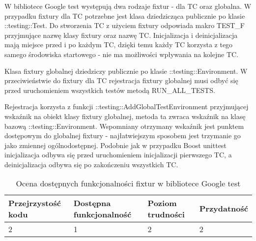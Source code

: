 \documentclass[12pt,a4paper,notitlepage]{report}
\begin{document}
W bibliotece Google test występują dwa rodzaje fixtur - dla TC oraz globalna.
W przypadku fixtury dla TC potrzebne jest klasa dziedzicząca publicznie po klasie ::testing::Test. Do stworzenia TC z użyciem fixtury odpowiada makro TEST{\_}F przyjmujące nazwę klasy fixtury oraz nazwę TC. Inicjalizacja i deinicjalizacja mają miejsce przed i po każdym TC, dzięki temu każdy TC korzysta z tego samego środowiska startowego - nie ma możliwości wpływania na kolejne TC.

			

Klasa fixtury globalnej dziedziczy publicznie po klasie ::testing::Environment. W przeciwieństwie do fixtury dla TC rejestracja fixtury globalnej musi odbyć się przed uruchomieniem wszystkich testów metodą RUN{\_}ALL{\_}TESTS.

Rejestracja korzysta z funkcji ::testing::AddGlobalTestEnvironment przyjmującej wskaźnik na obiekt klasy fixtury globalnej, metoda ta zwraca wskaźnik na klasę bazową ::testing::Environment. 
Wspomniany otrzymany wskaźnik jest punktem dostępowym do globalnej fixtury - najłatwiejszym sposobem jest trzymanie go jako zmiennej ogólnodostępnej.
Podobnie jak w przypadku Boost unittest inicjalizacja odbywa się przed uruchomieniem inicjalizacji pierwszego TC, a deinicjalizacja odbywa się po zakończeniu wszystkich TC.

			

\begin{center}
			\begin{table}[!ht]
			\caption{Ocena dostępnych funkcjonalności fixtur w bibliotece Google test}
			\label{}
			\begin{tabular}[!hc]{|l|l|l|l|}
		\hline
		Przejrzystość kodu 	&	Dostępna funkcjonalność	&	Poziom trudności	&	Przydatność \\ \hline
		2					&	1						&	2					& 	2  			\\ \hline
			\end{tabular}
			\end{table} 
		\end{center}
\end{document}
